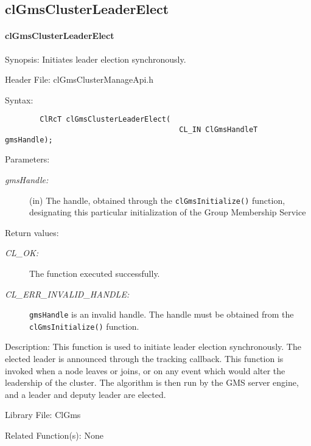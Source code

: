 \begin{flushleft}
\subsection{clGmsClusterLeaderElect}
\hypertarget{pagegms205}{}\paragraph{cl\-Gms\-Cluster\-Leader\-Elect}\label{pagegms205}
\begin{Desc}
\item[Synopsis:]Initiates leader election synchronously.\end{Desc}
\begin{Desc}
\item[Header File:]clGmsClusterManageApi.h\end{Desc}
\begin{Desc}
\item[Syntax:]

\footnotesize\begin{verbatim}        ClRcT clGmsClusterLeaderElect(
                                		CL_IN ClGmsHandleT     gmsHandle);
\end{verbatim}
\normalsize
\end{Desc}
\begin{Desc}
\item[Parameters:]
\begin{description}
\item[{\em gms\-Handle:}](in) The handle, obtained through the {\tt{clGmsInitialize()}} function, designating this particular initialization of the Group
Membership Service\end{description}
\end{Desc}
\begin{Desc}
\item[Return values:]
\begin{description}
\item[{\em CL\_\-OK:}]The function executed successfully.
\item[{\em CL\_\-ERR\_\-INVALID\_\-HANDLE:}]{\tt{gmsHandle}} is an invalid handle. The handle must be obtained from the
{\tt{clGmsInitialize()}} function.\end{description}
\end{Desc}
\begin{Desc}
\item[Description:]This function is used to initiate leader election synchronously. The elected leader is announced through the tracking callback.
This function is invoked when a node leaves or joins, or on any event which would alter the leadership of the cluster. The algorithm is then run
by the GMS server engine, and a leader and deputy leader are elected.\end{Desc}
\begin{Desc}
\item[Library File:]Cl\-Gms\end{Desc}
\begin{Desc}
\item[Related Function(s):]None \end{Desc}
\newpage



\end{flushleft}
